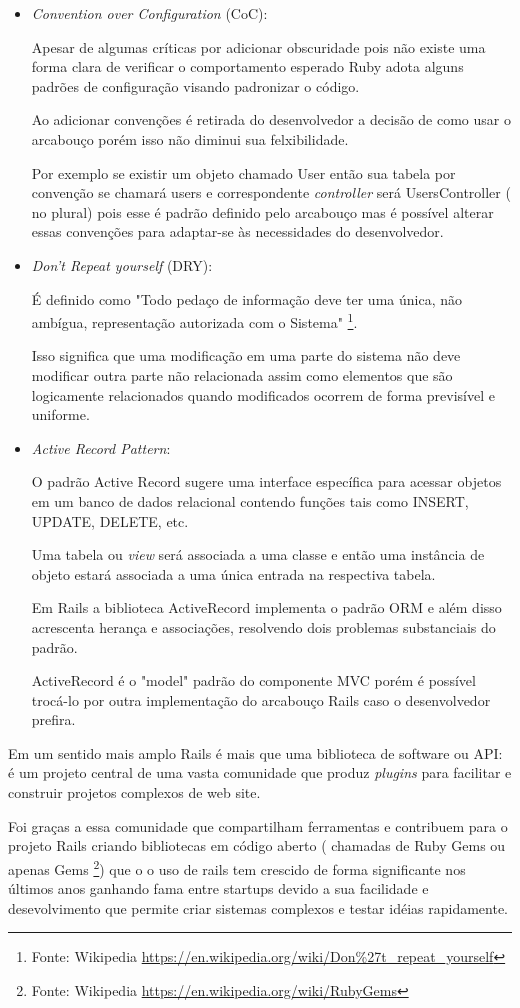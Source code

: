 \begin{itemize}
\item {\emph{Convention over Configuration} (CoC):}
    \par Apesar de algumas críticas por adicionar obscuridade pois não existe uma forma clara de verificar o comportamento esperado Ruby adota alguns padrões de configuração visando padronizar o código.
    \par Ao adicionar convenções é retirada do desenvolvedor a decisão de como usar o arcabouço porém isso não diminui sua felxibilidade. 
    \par Por exemplo se existir um objeto chamado User então sua tabela por convenção se chamará users e correspondente \emph{controller} será UsersController ( no plural) pois esse é padrão definido pelo arcabouço mas é possível alterar essas convenções para adaptar-se às necessidades do desenvolvedor.

\item {\emph{Don't Repeat yourself} (DRY):}
    \par É definido como "Todo pedaço de informação deve ter uma única, não ambígua, representação autorizada com o Sistema" \footnote{Fonte: Wikipedia \url{https://en.wikipedia.org/wiki/Don\%27t_repeat_yourself}}.
    \par Isso significa que uma modificação em uma parte do sistema não deve modificar outra parte não relacionada assim como elementos que são logicamente relacionados quando modificados ocorrem de forma previsível e uniforme.

\item { \emph{Active Record Pattern}:}
    \par O padrão Active Record sugere uma interface específica para acessar objetos em um banco de dados relacional contendo funções tais como INSERT, UPDATE, DELETE, etc.
    \par Uma tabela ou \emph{view} será associada a uma classe e então uma instância de objeto estará associada a uma única entrada na respectiva tabela.
    \par Em Rails a biblioteca ActiveRecord implementa o padrão ORM e além disso acrescenta herança e associações, resolvendo dois problemas substanciais do padrão.
    \par ActiveRecord é o "model" padrão do componente MVC porém é possível trocá-lo por outra implementação do arcabouço Rails caso o desenvolvedor prefira.
\end{itemize}
    \par Em um sentido mais amplo Rails é mais que uma biblioteca de software ou API: é um projeto central de uma vasta comunidade que produz \emph{plugins} para facilitar e construir projetos complexos de web site. 
    \par Foi graças a essa comunidade que compartilham ferramentas e contribuem para o projeto Rails criando bibliotecas em código aberto ( chamadas de Ruby Gems ou apenas Gems \footnote{Fonte: Wikipedia \url{https://en.wikipedia.org/wiki/RubyGems}}) que o o uso de rails tem crescido de forma significante nos últimos anos ganhando fama entre startups devido a sua  facilidade e desevolvimento que permite criar sistemas complexos e testar idéias rapidamente.

